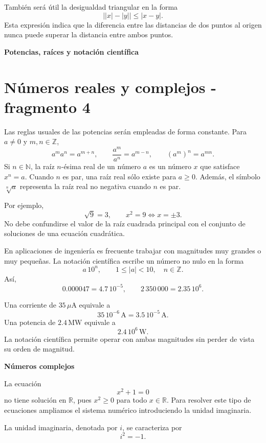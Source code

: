 También será útil la desigualdad triangular en la forma
\[
\bigl||x|-|y|\bigr|\leq|x-y|.
\]
Esta expresión indica que la diferencia entre las distancias de dos puntos al origen nunca puede superar la distancia entre ambos puntos.

\textbf{Potencias, raíces y notación científica}


\section{Números reales y complejos - fragmento 4}
Las reglas usuales de las potencias serán empleadas de forma constante. Para \(a\neq0\) y \(m,n\in\mathbb{Z}\),
\[
a^m a^n=a^{m+n},
\qquad
\frac{a^m}{a^n}=a^{m-n},
\qquad
(a^m)^n=a^{mn}.
\]
Si \(n\in\mathbb{N}\), la raíz \(n\)-ésima real de un número \(a\) es un número \(x\) que satisface \(x^n=a\). Cuando \(n\) es par, una raíz real sólo existe para \(a\geq0\). Además, el símbolo \(\sqrt[n]{a}\) representa la raíz real no negativa cuando \(n\) es par.

Por ejemplo,
\[
\sqrt{9}=3,
\qquad
x^2=9\Longleftrightarrow x=\pm3.
\]
No debe confundirse el valor de la raíz cuadrada principal con el conjunto de soluciones de una ecuación cuadrática.

En aplicaciones de ingeniería es frecuente trabajar con magnitudes muy grandes o muy pequeñas. La notación científica escribe un número no nulo en la forma
\[
a\,10^n,\qquad 1\leq |a|<10,\quad n\in\mathbb{Z}.
\]
Así,
\[
0.000047=4.7\,10^{-5},
\qquad
2\,350\,000=2.35\,10^6.
\]

\begin{example}
Una corriente de \(35\,\mu\mathrm{A}\) equivale a
\[
35\,10^{-6}\,\mathrm{A}=3.5\,10^{-5}\,\mathrm{A}.
\]
Una potencia de \(2.4\,\mathrm{MW}\) equivale a
\[
2.4\,10^6\,\mathrm{W}.
\]
La notación científica permite operar con ambas magnitudes sin perder de vista su orden de magnitud.
\end{example}

\textbf{Números complejos}

La ecuación
\[
x^2+1=0
\]
no tiene solución en \(\mathbb{R}\), pues \(x^2\geq0\) para todo \(x\in\mathbb{R}\). Para resolver este tipo de ecuaciones ampliamos el sistema numérico introduciendo la unidad imaginaria.

\begin{definition}
La unidad imaginaria, denotada por \(i\), se caracteriza por
\[
i^2=-1.
\]
\end{definition}

